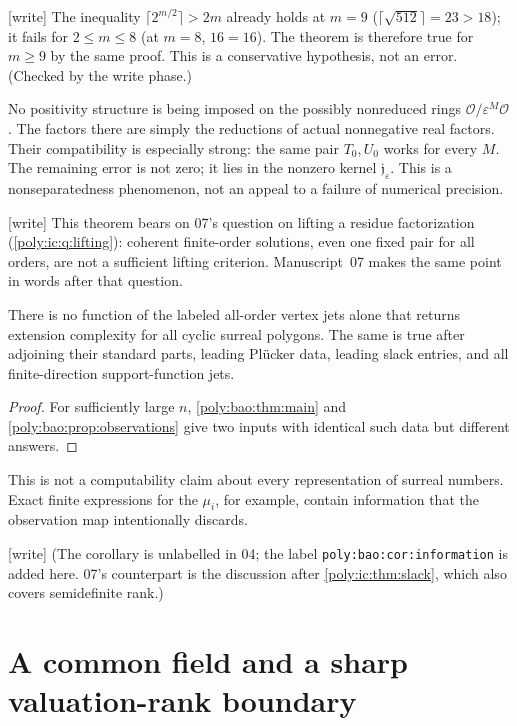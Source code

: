 \documentclass[11pt,a4paper]{article}
\numberwithin{equation}{section}
\theoremstyle{plain}
\newcommand{\wtag}{\textup{[write]}}%
\newcommand{\eps}{\varepsilon}
\newcommand{\OO}{\mathcal O}
\newcommand{\JJ}{\mathfrak j}
\begin{document}
\begin{remark}\label{poly:bao:rem:mten}
\wtag{} The inequality $\lceil2^{m/2}\rceil>2m$ already holds at $m=9$
($\lceil\sqrt{512}\rceil=23>18$); it fails for $2\leq m\leq8$ (at $m=8$,
$16=16$). The theorem is therefore true for $m\geq9$ by the same proof.
This is a conservative hypothesis, not an error. (Checked by the write
phase.)
\end{remark}

No positivity structure is being imposed on the possibly nonreduced
rings $\OO/\eps^M\OO$. The factors there are simply the reductions of
actual nonnegative real factors. Their compatibility is especially strong:
the same pair $T_0,U_0$ works for every $M$. The remaining error is not
zero; it lies in the nonzero kernel $\JJ_\eps$. This is a nonseparatedness
phenomenon, not an appeal to a failure of numerical precision.

\wtag{} This theorem bears on 07's question on lifting a residue
factorization (\cref{poly:ic:q:lifting}): coherent finite-order solutions,
even one fixed pair for all orders, are not a sufficient lifting criterion.
Manuscript~07 makes the same point in words after that question.

\begin{corollary}\label{poly:bao:cor:information}
There is no function of the labeled all-order vertex jets alone that
returns extension complexity for all cyclic surreal polygons. The same
is true after adjoining their standard parts, leading Pl\"ucker data,
leading slack entries, and all finite-direction support-function jets.
\end{corollary}
\begin{proof}
For sufficiently large $n$, \cref{poly:bao:thm:main} and
\cref{poly:bao:prop:observations} give two inputs with identical such data but
different answers.
\end{proof}
This is not a computability claim about every representation of surreal
numbers. Exact finite expressions for the $\mu_i$, for example, contain
information that the observation map intentionally discards.

\wtag{} (The corollary is unlabelled in 04; the label
\texttt{poly:bao:cor:information} is added here. 07's counterpart is the
discussion after \cref{poly:ic:thm:slack}, which also covers semidefinite
rank.)

\section{A common field and a sharp valuation-rank boundary}\label{poly:ic:sec:field}
\end{document}

